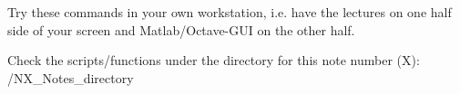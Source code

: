 \documentclass[xcolor=dvipsnames,11pt]{beamer}
\begin{document}

\begin{frame}
\frametitle{\secname}

\vspace{-7pt}
\begin{exampleblock}{}
	Try these commands in your own workstation, i.e. have the lectures on one half side of your screen and Matlab/Octave-GUI on the other half. %
\end{exampleblock}

\begin{alertblock}{}
	Check the scripts/functions under the directory for this note number (X): \newline
	/NX\_Notes\_directory
\end{alertblock}

\end{frame}	



	
\end{document}
